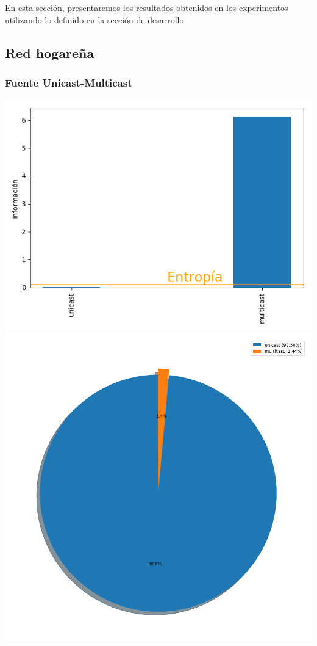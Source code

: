 En esta secci\'on, presentaremos los resultados obtenidos en los experimentos utilizando lo definido en la secci\'on de desarrollo.

\subsection{Red hogareña}

\subsubsection{Fuente Unicast-Multicast}

\hspace*{-1.5cm}
 \includegraphics[scale=0.6]{../plots/mauro_s1_informacion.png}
 \includegraphics[scale=0.4]{../plots/mauro_s1_probabilidades.png}

